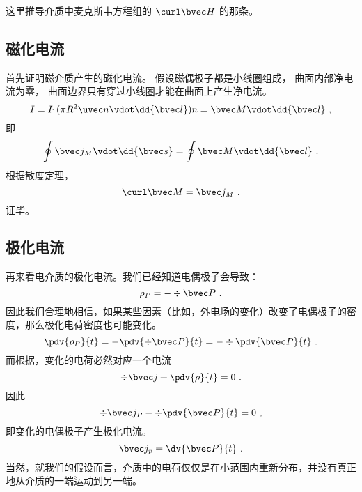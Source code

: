


这里推导介质中麦克斯韦方程组的 $\curl \bvec H$ 的那条。

\subsection{磁化电流}
首先证明磁介质产生的磁化电流。 假设磁偶极子都是小线圈组成， 曲面内部净电流为零， 曲面边界只有穿过小线圈才能在曲面上产生净电流。
\begin{equation}
I = I_1 (\pi R^2 \uvec n \vdot \dd{\bvec l}) n = \bvec M \vdot \dd{\bvec l}~,
\end{equation}
即
\begin{equation}
\oint \bvec j_M \vdot \dd{\bvec s} = \oint \bvec M \vdot \dd{\bvec l}~.
\end{equation}
根据散度定理，
\begin{equation}
\curl \bvec M = \bvec j_M~.
\end{equation}
证毕。

\subsection{极化电流}
再来看电介质的极化电流。我们已经知道电偶极子会导致：
$$\rho_P=-\div \bvec P~.$$
因此我们合理地相信，如果某些因素（比如，外电场的变化）改变了电偶极子的密度，那么极化电荷密度也可能变化。
$$\pdv{\rho_P}{t}=-\pdv{\div \bvec P}{t}=-\div \pdv{\bvec P}{t}~.$$
而根据，变化的电荷必然对应一个电流
$$\div \bvec j + \pdv{\rho}{t}=0~.$$
因此
$$
\div \bvec j_P -\div \pdv{\bvec P}{t}=0~,
$$
即变化的电偶极子产生极化电流。
\begin{equation}
\bvec j_p = \dv{\bvec P}{t}~.
\end{equation}
当然，就我们的假设而言，介质中的电荷仅仅是在小范围内重新分布，并没有真正地从介质的一端运动到另一端。

